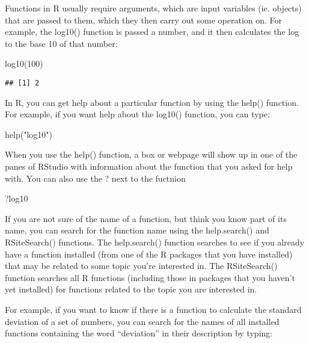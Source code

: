 \documentclass[
]{book}
\newenvironment{Shaded}{\begin{snugshade}}{\end{snugshade}}
\newcommand{\DecValTok}[1]{\textcolor[rgb]{0.00,0.00,0.81}{#1}}
\newcommand{\FunctionTok}[1]{\textcolor[rgb]{0.00,0.00,0.00}{#1}}
\newcommand{\NormalTok}[1]{#1}
\newcommand{\StringTok}[1]{\textcolor[rgb]{0.31,0.60,0.02}{#1}}
\begin{document}
Functions in R usually require arguments, which are input variables (ie. objects) that are passed to them, which they then carry out some operation on. For example, the log10() function is passed a number, and it then calculates the log to the base 10 of that number:

\begin{Shaded}
\begin{Highlighting}[]
\FunctionTok{log10}\NormalTok{(}\DecValTok{100}\NormalTok{)}
\end{Highlighting}
\end{Shaded}

\begin{verbatim}
## [1] 2
\end{verbatim}

In R, you can get help about a particular function by using the help() function. For example, if you want help about the log10() function, you can type:

\begin{Shaded}
\begin{Highlighting}[]
\FunctionTok{help}\NormalTok{(}\StringTok{"log10"}\NormalTok{)}
\end{Highlighting}
\end{Shaded}

When you use the help() function, a box or webpage will show up in one of the panes of RStudio with information about the function that you asked for help with. You can also use the ? next to the fuctnion

\begin{Shaded}
\begin{Highlighting}[]
\NormalTok{?log10}
\end{Highlighting}
\end{Shaded}

If you are not sure of the name of a function, but think you know part of its name, you can search for the function name using the help.search() and RSiteSearch() functions. The help.search() function searches to see if you already have a function installed (from one of the R packages that you have installed) that may be related to some topic you're interested in. The RSiteSearch() function searches all R functions (including those in packages that you haven't yet installed) for functions related to the topic you are interested in.

For example, if you want to know if there is a function to calculate the standard deviation of a set of numbers, you can search for the names of all installed functions containing the word ``deviation'' in their description by typing:
\end{document}

